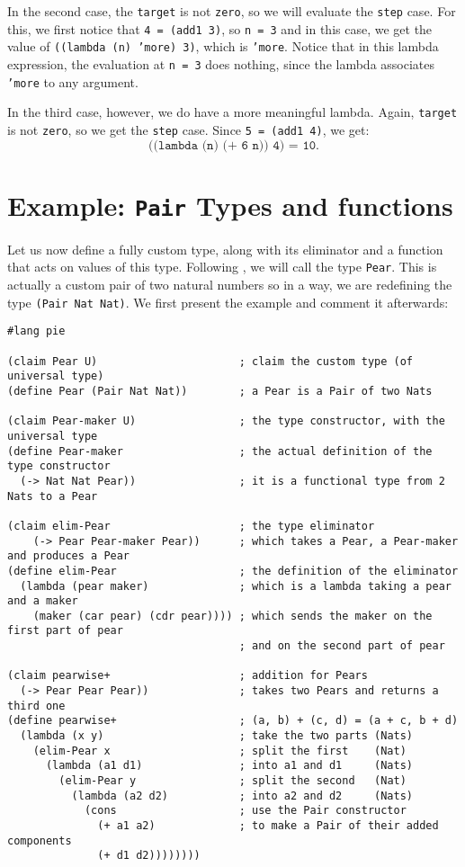 In the second case, the \texttt{target} is not \texttt{zero}, so we
will evaluate the \texttt{step} case. For this, we first notice that
\texttt{4 = (add1 3)}, so \texttt{n = 3} and in this case, we get
the value of \texttt{((lambda (n) 'more) 3)}, which is \texttt{'more}.
Notice that in this lambda expression, the evaluation at \texttt{n = 3}
does nothing, since the lambda associates \texttt{'more} to any argument.

In the third case, however, we do have a more meaningful lambda.
Again, \texttt{target} is not \texttt{zero}, so we get the \texttt{step}
case. Since \texttt{5 = (add1 4)}, we get:
\[
  \texttt{((lambda (n) (+ 6 n)) 4) = 10}.
\]

\section{Example: \texttt{Pair} Types and functions}

Let us now define a fully custom type, along with its eliminator
and a function that acts on values of this type. Following
\cite{typer}, we will call the type \texttt{Pear}. This is actually
a custom pair of two natural numbers so in a way, we are redefining
the type \texttt{(Pair Nat Nat)}. We first present the example and
comment it afterwards:
{
  \small
\begin{verbatim}
#lang pie

(claim Pear U)                      ; claim the custom type (of universal type)
(define Pear (Pair Nat Nat))        ; a Pear is a Pair of two Nats

(claim Pear-maker U)                ; the type constructor, with the universal type
(define Pear-maker                  ; the actual definition of the type constructor
  (-> Nat Nat Pear))                ; it is a functional type from 2 Nats to a Pear

(claim elim-Pear                    ; the type eliminator
    (-> Pear Pear-maker Pear))      ; which takes a Pear, a Pear-maker and produces a Pear
(define elim-Pear                   ; the definition of the eliminator
  (lambda (pear maker)              ; which is a lambda taking a pear and a maker
    (maker (car pear) (cdr pear)))) ; which sends the maker on the first part of pear
                                    ; and on the second part of pear

(claim pearwise+                    ; addition for Pears
  (-> Pear Pear Pear))              ; takes two Pears and returns a third one
(define pearwise+                   ; (a, b) + (c, d) = (a + c, b + d)
  (lambda (x y)                     ; take the two parts (Nats)
    (elim-Pear x                    ; split the first    (Nat)
      (lambda (a1 d1)               ; into a1 and d1     (Nats)
        (elim-Pear y                ; split the second   (Nat)
          (lambda (a2 d2)           ; into a2 and d2     (Nats)
            (cons                   ; use the Pair constructor
              (+ a1 a2)             ; to make a Pair of their added components
              (+ d1 d2))))))))
\end{verbatim}
}

